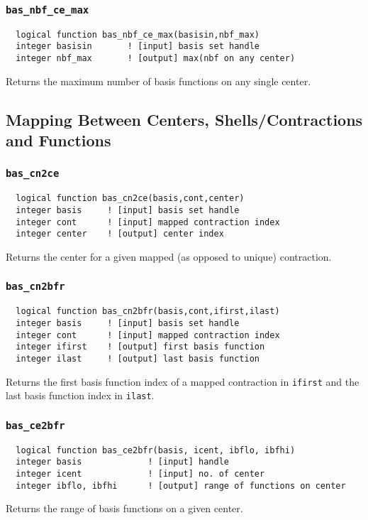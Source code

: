 \subsubsection{{\tt bas\_nbf\_ce\_max}}
\begin{verbatim}
  logical function bas_nbf_ce_max(basisin,nbf_max)
  integer basisin       ! [input] basis set handle
  integer nbf_max       ! [output] max(nbf on any center)
\end{verbatim}
Returns the maximum number of basis functions on any single center.

\subsection{Mapping Between Centers, Shells/Contractions and Functions}

\subsubsection{{\tt bas\_cn2ce}}
\begin{verbatim}
  logical function bas_cn2ce(basis,cont,center)
  integer basis     ! [input] basis set handle
  integer cont      ! [input] mapped contraction index
  integer center    ! [output] center index
\end{verbatim}
Returns the center for a given mapped (as opposed to unique)
contraction.

\subsubsection{{\tt bas\_cn2bfr}}
\begin{verbatim}
  logical function bas_cn2bfr(basis,cont,ifirst,ilast)
  integer basis     ! [input] basis set handle
  integer cont      ! [input] mapped contraction index
  integer ifirst    ! [output] first basis function
  integer ilast     ! [output] last basis function     
\end{verbatim}
Returns the first basis function index of a mapped contraction in
{\tt ifirst} and the last basis function index in {\tt ilast}.

\subsubsection{{\tt bas\_ce2bfr}}
\begin{verbatim}
  logical function bas_ce2bfr(basis, icent, ibflo, ibfhi)
  integer basis             ! [input] handle
  integer icent             ! [input] no. of center
  integer ibflo, ibfhi      ! [output] range of functions on center
\end{verbatim}
Returns the range of basis functions on a given center.

